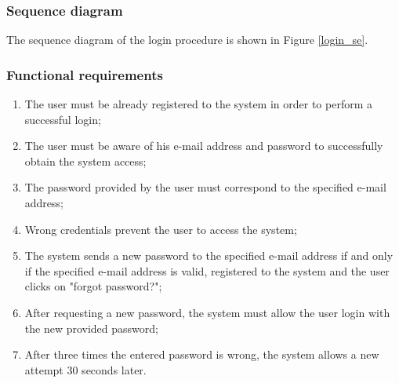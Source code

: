 \subsubsection{Sequence diagram}
The sequence diagram of the login procedure is shown in Figure \ref{login_se}.

\subsubsection{Functional requirements}
\begin{enumerate}
\item The user must be already registered to the system in order to perform a successful login;
\item The user must be aware of his e-mail address and password to successfully obtain the system access;
\item The password provided by the user must correspond to the specified e-mail address;
\item Wrong credentials prevent the user to access the system;
\item The system sends a new password to the specified e-mail address if and only if the specified e-mail address is valid, registered to the system and the user clicks on "forgot password?";
\item After requesting a new password, the system must allow the user login with the new provided password;
\item After three times the entered password is wrong, the system allows a new attempt 30 seconds later.
\end{enumerate}

